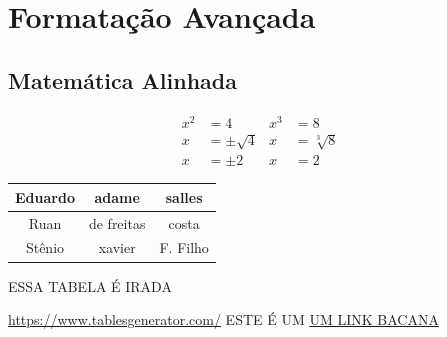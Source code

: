 \documentclass[11pt,a4paper]{article}
\begin{document}
\section{Formatação Avançada}
\subsection{Matemática Alinhada}
\begin{align*}
x^2 &= 4 & x^3 &= 8\\
x &= \pm \sqrt{4} & x &= \sqrt[3]{8}\\
x &=\pm 2 & x &= 2
\end{align*}

\begin{tabular}{|c|c|c|}
\hline
Eduardo & adame & salles\\
\hline
Ruan & de freitas & costa\\
\hline
Stênio & xavier & F. Filho\\
\hline
\end{tabular}

\newpage
ESSA TABELA É IRADA
\begin{table}[!h]
\centering
{}
\end{table}


\url{https://www.tablesgenerator.com/}
ESTE É UM \href{http://www.sharelatex.com}{UM LINK BACANA}
\end{document}
